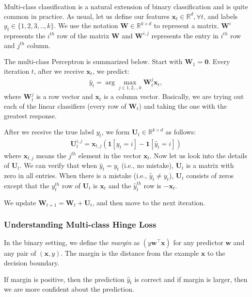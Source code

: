 \documentclass{article}
\begin{document}
Multi-class classification is a natural extension of binary classification and is quite common in practice.
As usual, let us define our features $\mathbf{x}_t\in\mathbb{R}^d, \forall t$, and labels $y_t \in \{1,2,3,..,k\}$. We use the notation $\mathbf{W}\in\mathbb{R}^{k\times d}$ to represent a matrix. $\mathbf{W}^{i}$ represents the $i^{th}$ row of the matrix $\mathbf{W}$ and $\mathbf{W}^{i,j}$ represents the entry in $i^{th}$ row and $j^{th}$ column.

The multi-class Perceptron is summarized below.
Start with $\mathbf{W}_1 = \mathbf{0}$.
Every iteration $t$, after we receive $\mathbf{x}_t$, we predict:
\begin{align}
\hat{y}_t = \arg\max_{j\in {1,2,.,k}}\mathbf{W}_t^j \mathbf{x}_t,
\end{align}
where $\mathbf{W}_t^j$ is a row vector and $\mathbf{x}_t$ is a column vector. Basically, we are trying out each of the linear classifiers (every row of $\mathbf{W}_t$) and taking the one with the greatest response. 

After we receive the true label $y_t$, we form $\mathbf{U}_t \in \mathbb{R}^{k\times d}$ as follows:
\begin{align}
    \mathbf{U}_t^{i,j} = \mathbf{x}_{t,j}(\mathbf{1}[y_t = i] - \mathbf{1}[\hat{y}_t = i])
\end{align} where $\mathbf{x}_{t,j}$ means the $j^{th}$ element in the vector $\mathbf{x}_t$. Now let us look into the details of $\mathbf{U}_t$. We can verify that when $\hat{y}_t = y_t$ (i.e., no mistake), $\mathbf{U}_t$ is a matrix with zero in all entries. When there is a mistake (i.e., $\hat{y}_t\neq y_t$), $\mathbf{U}_t$ consists of zeros except that the $y_t^{th}$ row of $\mathbf{U}_t$ is $\mathbf{x}_t$ and the $\hat{y}_t^{th}$ row is $-\mathbf{x}_t$.

We update $\mathbf{W}_{t+1} = \mathbf{W}_t + \mathbf{U}_t$, and then move to the next iteration. 

\subsubsection{Understanding Multi-class Hinge Loss}
In the binary setting, we define the \emph{margin} as $(y \mathbf{w}^{\top} \mathbf{x})$ for any predictor $\mathbf{w}$ and any pair of $(\mathbf{x},y)$. The margin is the distance from the example $\mathbf{x}$ to the decision boundary. 

If margin is positive, then the prediction $\hat{y}_t$ is correct and if margin is larger, then we are more confident about the prediction. 
\end{document}
